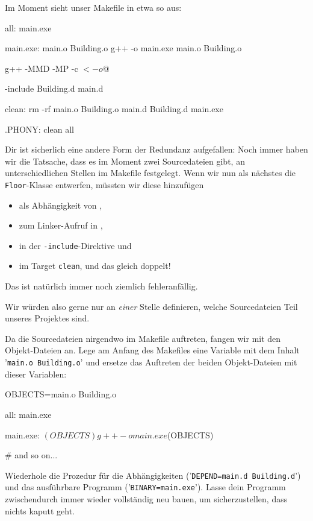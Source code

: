 Im Moment sieht unser Makefile in etwa so aus:
\begin{lstmake}
all: main.exe

main.exe: main.o Building.o
    g++ -o main.exe main.o Building.o

    g++ -MMD -MP -c $< -o $@

-include Building.d main.d

clean:
    rm -rf main.o Building.o main.d Building.d main.exe
    
.PHONY: clean all
\end{lstmake}

Dir ist sicherlich eine andere Form der Redundanz aufgefallen:
Noch immer haben wir die Tatsache, dass es im Moment zwei Sourcedateien gibt, an unterschiedlichen Stellen im Makefile festgelegt.
Wenn wir nun als nächstes die \lstinline{Floor}-Klasse entwerfen, müssten wir diese hinzufügen
\begin{itemize}
    \item als Abhängigkeit von ,
    \item zum Linker-Aufruf in ,
    \item in der \lstinline{-include}-Direktive und
    \item im Target \lstinline{clean}, und das gleich doppelt!
\end{itemize}
Das ist natürlich immer noch ziemlich fehleranfällig.

Wir würden also gerne nur an \emph{einer} Stelle definieren, welche Sourcedateien Teil unseres Projektes sind.

Da die Sourcedateien nirgendwo im Makefile auftreten, fangen wir mit den Objekt-Dateien an.
Lege am Anfang des Makefiles eine Variable mit dem Inhalt '\lstinline{main.o Building.o}' und ersetze das Auftreten der beiden Objekt-Dateien mit dieser Variablen:
\begin{lstmake}
OBJECTS=main.o Building.o

all: main.exe

main.exe: $(OBJECTS)
    g++ -o main.exe $(OBJECTS)
    
# and so on...
\end{lstmake}

Wiederhole die Prozedur für die Abhängigkeiten ('\lstinline{DEPEND=main.d Building.d}') und das ausführbare Programm ('\lstinline{BINARY=main.exe}').
Lasse dein Programm zwischendurch immer wieder vollständig neu bauen, um sicherzustellen, dass nichts kaputt geht.

